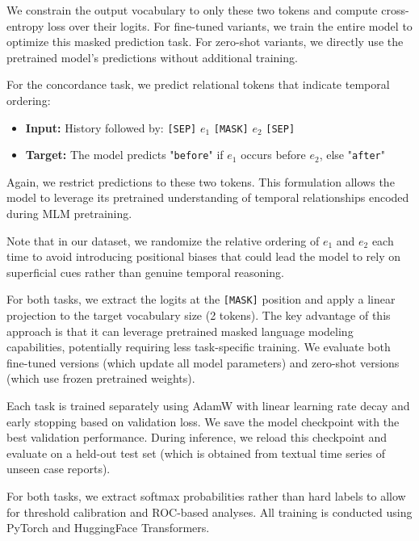 We constrain the output vocabulary to only these two tokens and compute cross-entropy loss over their logits.
For fine-tuned variants, we train the entire model to optimize this masked prediction task.
For zero-shot variants, we directly use the pretrained model's predictions without additional training.

For the concordance task, we predict relational tokens that indicate temporal ordering:

\begin{itemize}
    \item \textbf{Input:} History followed by: \texttt{[SEP]} $e_1$ \texttt{[MASK]} $e_2$ \texttt{[SEP]}
    \item \textbf{Target:} The model predicts "\texttt{before}" if $e_1$ occurs before $e_2$, else "\texttt{after}"
\end{itemize}

Again, we restrict predictions to these two tokens.
This formulation allows the model to leverage its pretrained understanding of temporal relationships encoded during MLM pretraining.

Note that in our dataset, we randomize the relative ordering of $e_1$ and $e_2$ each time to avoid introducing positional biases that could lead the model to rely on superficial cues rather than genuine temporal reasoning.

For both tasks, we extract the logits at the \texttt{[MASK]} position and apply a linear projection to the target vocabulary size (2 tokens).
The key advantage of this approach is that it can leverage pretrained masked language modeling capabilities, potentially requiring less task-specific training.
We evaluate both fine-tuned versions (which update all model parameters) and zero-shot versions (which use frozen pretrained weights).

Each task is trained separately using AdamW with linear learning rate decay and early stopping based on validation loss.
We save the model checkpoint with the best validation performance.
During inference, we reload this checkpoint and evaluate on a held-out test set (which is obtained from textual time series of unseen case reports).

For both tasks, we extract softmax probabilities rather than hard labels to allow for threshold calibration and ROC-based analyses.
All training is conducted using PyTorch and HuggingFace Transformers.
\FloatBarrier
